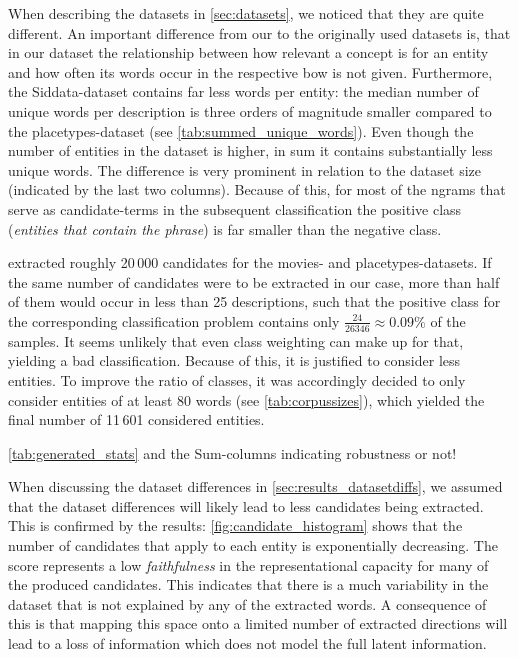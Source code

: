 When describing the datasets in \autoref{sec:datasets}, we noticed that they are quite different. An important difference from our to the originally used datasets is, that in our dataset the relationship between how relevant a concept is for an entity and how often its words occur in the respective \gls{bow} is not given. Furthermore, the Siddata-dataset contains far less words per entity: the median number of unique words per description is three orders of magnitude smaller compared to the placetypes-dataset (see \autoref{tab:summed_unique_words}). Even though the number of entities in the dataset is higher, in sum it contains substantially less unique words. The difference is very prominent in relation to the dataset size (indicated by the last two columns). Because of this, for most of the \glspl{ngram} that serve as candidate-terms in the subsequent classification the positive class (\textit{entities that contain the phrase}) is far smaller than the negative class. 

\textcite{Derrac2015} extracted roughly 20\,000 candidates for the movies- and placetypes-datasets. If the same number of candidates were to be extracted in our case, more than half of them would occur in less than 25 descriptions, such that the positive class for the corresponding classification problem contains only $\frac{24}{26346} \approx 0.09\%$ of the samples. It seems unlikely that even class weighting can make up for that, yielding a bad classification. Because of this, it is justified to consider less entities. To improve the ratio of classes, it was accordingly decided to only consider entities of at least 80 words (see \autoref{tab:corpussizes}), which yielded the final number of 11\,601 considered entities. 

 \autoref{tab:generated_stats} and the Sum-columns indicating robustness or not!

When discussing the dataset differences in \autoref{sec:results_datasetdiffs}, we assumed that the dataset differences will likely lead to less candidates being extracted. This is confirmed by the results: \autoref{fig:candidate_histogram} shows that the number of candidates that apply to each entity is exponentially decreasing. The score represents a low \textit{faithfulness} in the representational capacity for many of the produced candidates. This indicates that there is a much variability in the dataset that is not explained by any of the extracted words. A consequence of this is that mapping this space onto a limited number of extracted directions will lead to a loss of information which does not model the full latent information.

